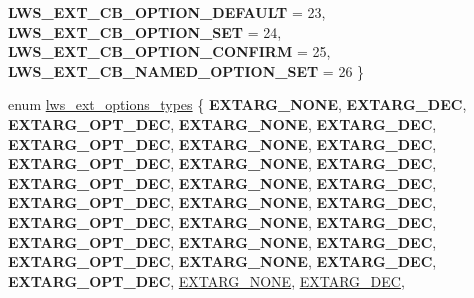 \begin{DoxyCompactItemize}
{\bfseries L\+W\+S\+\_\+\+E\+X\+T\+\_\+\+C\+B\+\_\+\+O\+P\+T\+I\+O\+N\+\_\+\+D\+E\+F\+A\+U\+LT} = 23, 
{\bfseries L\+W\+S\+\_\+\+E\+X\+T\+\_\+\+C\+B\+\_\+\+O\+P\+T\+I\+O\+N\+\_\+\+S\+ET} = 24, 
\newline
{\bfseries L\+W\+S\+\_\+\+E\+X\+T\+\_\+\+C\+B\+\_\+\+O\+P\+T\+I\+O\+N\+\_\+\+C\+O\+N\+F\+I\+RM} = 25, 
{\bfseries L\+W\+S\+\_\+\+E\+X\+T\+\_\+\+C\+B\+\_\+\+N\+A\+M\+E\+D\+\_\+\+O\+P\+T\+I\+O\+N\+\_\+\+S\+ET} = 26
 \}
\item 
enum \hyperlink{group__extensions_gacc9f55936dc165257a2e1f7d47bce89e}{lws\+\_\+ext\+\_\+options\+\_\+types} \{ \newline
{\bfseries E\+X\+T\+A\+R\+G\+\_\+\+N\+O\+NE}, 
{\bfseries E\+X\+T\+A\+R\+G\+\_\+\+D\+EC}, 
{\bfseries E\+X\+T\+A\+R\+G\+\_\+\+O\+P\+T\+\_\+\+D\+EC}, 
{\bfseries E\+X\+T\+A\+R\+G\+\_\+\+N\+O\+NE}, 
\newline
{\bfseries E\+X\+T\+A\+R\+G\+\_\+\+D\+EC}, 
{\bfseries E\+X\+T\+A\+R\+G\+\_\+\+O\+P\+T\+\_\+\+D\+EC}, 
{\bfseries E\+X\+T\+A\+R\+G\+\_\+\+N\+O\+NE}, 
{\bfseries E\+X\+T\+A\+R\+G\+\_\+\+D\+EC}, 
\newline
{\bfseries E\+X\+T\+A\+R\+G\+\_\+\+O\+P\+T\+\_\+\+D\+EC}, 
{\bfseries E\+X\+T\+A\+R\+G\+\_\+\+N\+O\+NE}, 
{\bfseries E\+X\+T\+A\+R\+G\+\_\+\+D\+EC}, 
{\bfseries E\+X\+T\+A\+R\+G\+\_\+\+O\+P\+T\+\_\+\+D\+EC}, 
\newline
{\bfseries E\+X\+T\+A\+R\+G\+\_\+\+N\+O\+NE}, 
{\bfseries E\+X\+T\+A\+R\+G\+\_\+\+D\+EC}, 
{\bfseries E\+X\+T\+A\+R\+G\+\_\+\+O\+P\+T\+\_\+\+D\+EC}, 
{\bfseries E\+X\+T\+A\+R\+G\+\_\+\+N\+O\+NE}, 
\newline
{\bfseries E\+X\+T\+A\+R\+G\+\_\+\+D\+EC}, 
{\bfseries E\+X\+T\+A\+R\+G\+\_\+\+O\+P\+T\+\_\+\+D\+EC}, 
{\bfseries E\+X\+T\+A\+R\+G\+\_\+\+N\+O\+NE}, 
{\bfseries E\+X\+T\+A\+R\+G\+\_\+\+D\+EC}, 
\newline
{\bfseries E\+X\+T\+A\+R\+G\+\_\+\+O\+P\+T\+\_\+\+D\+EC}, 
{\bfseries E\+X\+T\+A\+R\+G\+\_\+\+N\+O\+NE}, 
{\bfseries E\+X\+T\+A\+R\+G\+\_\+\+D\+EC}, 
{\bfseries E\+X\+T\+A\+R\+G\+\_\+\+O\+P\+T\+\_\+\+D\+EC}, 
\newline
{\bfseries E\+X\+T\+A\+R\+G\+\_\+\+N\+O\+NE}, 
{\bfseries E\+X\+T\+A\+R\+G\+\_\+\+D\+EC}, 
{\bfseries E\+X\+T\+A\+R\+G\+\_\+\+O\+P\+T\+\_\+\+D\+EC}, 
\hyperlink{group__extensions_ggacc9f55936dc165257a2e1f7d47bce89eaabcf56c456c1ff6e81dc82586a16f14c}{E\+X\+T\+A\+R\+G\+\_\+\+N\+O\+NE}, 
\newline
\hyperlink{group__extensions_ggacc9f55936dc165257a2e1f7d47bce89ea1c86adf924c8786a12bee9687094673e}{E\+X\+T\+A\+R\+G\+\_\+\+D\+EC}, 

\end{DoxyCompactItemize}
